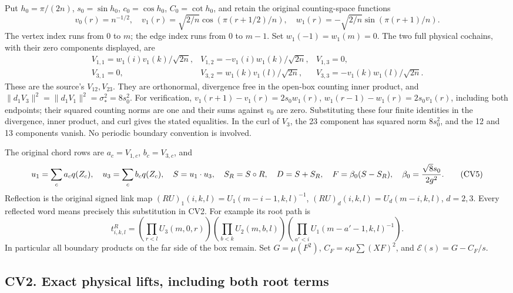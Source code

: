 \documentclass[11pt]{article}
\begin{document}
Put \(h_0=\pi/(2n)\), \(s_0=\sin h_0\), \(c_0=\cos h_0\),
\(C_0=\cot h_0\), and retain the original counting-space functions
\[
 v_0(r)=n^{-1/2},\quad
 v_1(r)=\sqrt{2/n}\cos(\pi(r+1/2)/n),\quad
 w_1(r)=-\sqrt{2/n}\sin(\pi(r+1)/n).                    \tag{CV3}
\]
The vertex index runs from 0 to \(m\); the edge index runs from 0 to
\(m-1\). Set \(w_1(-1)=w_1(m)=0\). The two full physical cochains,
with their zero components displayed, are
\[
\begin{array}{lll}
 V_{1,1}=w_1(i)v_1(k)/\sqrt{2n},&
 V_{1,2}=-v_1(i)w_1(k)/\sqrt{2n},&V_{1,3}=0,\\
 V_{3,1}=0,&V_{3,2}=w_1(k)v_1(l)/\sqrt{2n},&
 V_{3,3}=-v_1(k)w_1(l)/\sqrt{2n}.
\end{array}                                                    \tag{CV4}
\]
These are the source's \(V_{12},V_{23}\). They are orthonormal,
divergence free in the open-box counting inner product, and
\(\|d_1V_3\|^2=\|d_1V_1\|^2=\sigma_*^2=8s_0^2\).
For verification, \(v_1(r+1)-v_1(r)=2s_0w_1(r)\),
\(w_1(r-1)-w_1(r)=2s_0v_1(r)\), including both endpoints;
their squared counting norms are one and their sums against \(v_0\)
are zero. Substituting these four finite identities in the divergence,
inner product, and curl gives the stated equalities. In the curl of
\(V_3\), the 23 component has squared norm \(8s_0^2\), and the 12 and
13 components vanish. No periodic boundary convention is involved.

The original chord rows are \(a_c=V_{1,c}\), \(b_c=V_{3,c}\), and
\[
 u_1=\sum_ca_cq(Z_c),\quad u_3=\sum_cb_cq(Z_c),\quad
 S=u_1\cdot u_3,\quad S_R=S\circ R,\quad D=S+S_R,
 \quad F=\beta_0(S-S_R),\quad \beta_0={\sqrt8s_0\over2g^2}.
                                                               \tag{CV5}
\]
Reflection is the original signed link map
\((RU)_1(i,k,l)=U_1(m-i-1,k,l)^{-1}\),
\((RU)_d(i,k,l)=U_d(m-i,k,l)\), \(d=2,3\).
Every reflected word means precisely this substitution in CV2.
For example its root path is
\[
 t^R_{i,k,l}=
 \left(\prod_{r<l}U_3(m,0,r)\right)
 \left(\prod_{b<k}U_2(m,b,l)\right)
 \left(\prod_{a'<i}U_1(m-a'-1,k,l)^{-1}\right).            \tag{CV6}
\]
In particular all boundary products on the far side of the box remain.
Set \(G=\mu(F^2)\), \(C_F=\kappa\mu\sum(XF)^2\), and
\(\mathscr E(s)=G-C_F/s\).

\subsection*{CV2. Exact physical lifts, including both root terms}
\end{document}
